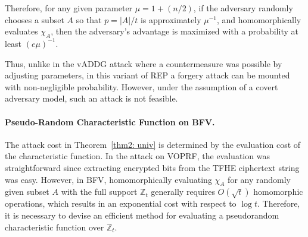 \documentclass[runningheads]{llncs}
\newcommand{\REP}{\textsf{REP}{}}
\begin{document}
        Therefore, for any given parameter $\mu=1+(n/2)$, if the adversary randomly chooses a subset $A$ so that $p=|A|/t$ is approximately $\mu^{-1}$, and homomorphically evaluates $\chi_A$, then the adversary's advantage is maximized with a probability at least $({e \mu})^{-1}$.
        
        Thus, unlike in the vADDG attack where a countermeasure was possible by adjusting parameters, in this variant of \REP{} a forgery attack can be mounted with non-negligible probability. However, under the assumption of a covert adversary model, such an attack is not feasible. 


        \paragraph{Pseudo-Random Characteristic Function on BFV.}
        The attack cost in Theorem~\ref{thm2: univ} is determined by the evaluation cost of the characteristic function. In the attack on VOPRF, the evaluation was straightforward since extracting encrypted bits from the TFHE ciphertext string was easy. However, in BFV, homomorphically evaluating \(\chi_A\) for any randomly given subset \(A\) with the full support \(\mathbb{Z}_t\) generally requires \(O(\sqrt{t})\) homomorphic operations, which results in an exponential cost with respect to \(\log t\). Therefore, it is necessary to devise an efficient method for evaluating a pseudorandom characteristic function over \(\mathbb{Z}_t\).
        
\end{document}
